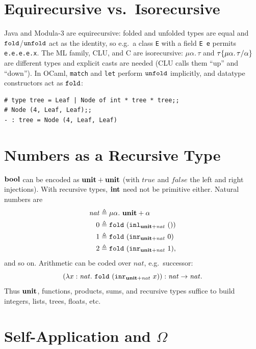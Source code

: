 \section{Equirecursive vs.\ Isorecursive}

Java and Modula-3 are equirecursive: folded and unfolded types are equal and
$\mathtt{fold}$/$\mathtt{unfold}$ act as the identity, so e.g.\ a class
\texttt{E} with a field \texttt{E e} permits \texttt{e.e.e.e.x}. The ML family,
CLU, and C are isorecursive: $\mu\alpha.\,\tau$ and
$\tau\{\mu\alpha.\,\tau/\alpha\}$ are different types and explicit casts
are needed (CLU calls them ``up'' and ``down''). In OCaml, \texttt{match} and
\texttt{let} perform $\mathtt{unfold}$ implicitly, and datatype constructors act as
$\mathtt{fold}$:
\begin{verbatim}
# type tree = Leaf | Node of int * tree * tree;;
# Node (4, Leaf, Leaf);;
- : tree = Node (4, Leaf, Leaf)
\end{verbatim}

\section{Numbers as a Recursive Type}

$\mathbf{bool}$ can be encoded as $\mathbf{unit} + \mathbf{unit}$ (with $\mathit{true}$ and
$\mathit{false}$ the left and right injections). With recursive types, $\mathbf{int}$
need not be primitive either. Natural numbers are
\begin{align*}
\mathit{nat} &\triangleq \mu\alpha.\ \mathbf{unit} + \alpha \\
0 &\triangleq \mathtt{fold}\ (\mathtt{inl}_{\mathbf{unit}+\mathit{nat}}\ ()) \\
1 &\triangleq \mathtt{fold}\ (\mathtt{inr}_{\mathbf{unit}+\mathit{nat}}\ 0) \\
2 &\triangleq \mathtt{fold}\ (\mathtt{inr}_{\mathbf{unit}+\mathit{nat}}\ 1),
\end{align*}
and so on. Arithmetic can be coded over $\mathit{nat}$, e.g.\ successor:
\[
(\lambda x : \mathit{nat}.\ \ttkw{fold}\ (\ttkw{inr}_{\kw{unit}+\mathit{nat}}\ x)) : \mathit{nat} \to \mathit{nat}.
\]
Thus $\mathbf{unit}$, functions, products, sums, and recursive types suffice to build
integers, lists, trees, floats, etc.

\section{Self-Application and $\Omega$}

